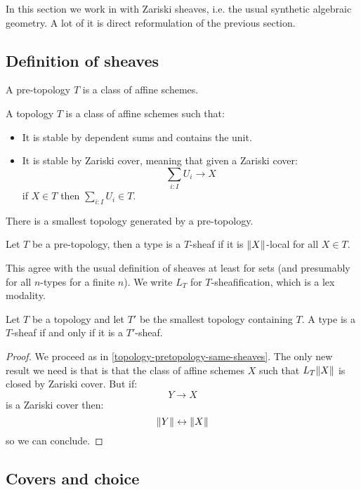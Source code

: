 In this section we work in with Zariski sheaves, i.e. the usual synthetic algebraic geometry. A lot of it is direct reformulation of the previous section.

\subsection{Definition of sheaves}

\begin{definition}
A pre-topology $T$ is a class of affine schemes.
\end{definition}

\begin{definition}
A topology $T$ is a class of affine schemes such that:
\begin{itemize}
\item It is stable by dependent sums and contains the unit.
\item It is stable by Zariski cover, meaning that given a Zariski cover:
\[\sum_{i:I}U_i \to X\]
if $X\in T$ then $\sum_{i:I}U_i\in T$.
\end{itemize}
\end{definition}

There is a smallest topology generated by a pre-topology. 

\begin{definition}
Let $T$ be a pre-topology, then a type is a $T$-sheaf if it is $\lVert X \rVert$-local for all $X\in T$. 
\end{definition}

This agree with the usual definition of sheaves at least for sets (and presumably for all $n$-types for a finite $n$). We write $L_T$ for $T$-sheafification, which is a lex modality. 

\begin{lemma}
Let $T$ be a topology and let $T'$ be the smallest topology containing $T$. A type is a $T$-sheaf if and only if it is a $T'$-sheaf.
\end{lemma}

\begin{proof}
We proceed as in \cref{topology-pretopology-same-sheaves}. The only new result we need is that is that the class of affine schemes $X$ such that $L_T\lVert X \rVert$ is closed by Zariski cover. But if:
\[Y\to X\]
is a Zariski cover then:
\[\lVert Y \rVert\leftrightarrow\lVert X \rVert\]
so we can conclude.
\end{proof}

\subsection{Covers and choice}

